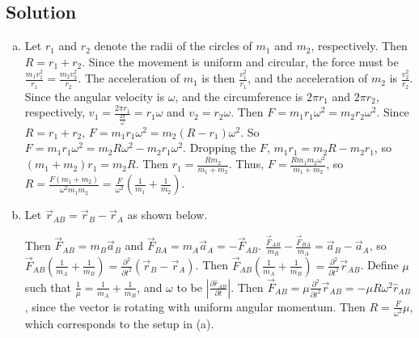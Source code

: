 \documentclass[solutions]{esg8012pset}
\begin{document}
\subsection{Solution}
  \begin{enumerate}[a)]
    \item Let $r_1$ and $r_2$ denote the radii of the circles of $m_1$ and $m_2$, respectively.  Then $R = r_1 + r_2$.  Since the movement is uniform and circular, the force must be $\frac{m_1 v_1^2}{r_1} = \frac{m_2 v_2^2}{r_2}$.  The acceleration of $m_1$ is then $\frac{v_1^2}{r_1}$, and the acceleration of $m_2$ is $\frac{v_2^2}{r_2}$.  Since the angular velocity is $\omega$, and the circumference is $2\pi r_1$ and $2\pi r_2$, respectively, $v_1 = \frac{2\pi r_1}{\frac{2\pi}{\omega}} = r_1 \omega$ and $v_2 = r_2 \omega$.  Then $F = m_1 r_1 \omega^2 =  m_2 r_2 \omega^2$.  Since $R = r_1 + r_2$, $F = m_1 r_1 \omega^2 = m_2 (R - r_1) \omega^2$.  So $F = m_1 r_1 \omega^2 = m_2 R \omega^2 - m_2 r_1 \omega^2$.  Dropping the $F$, $m_1 r_1 = m_2 R - m_2 r_1$, so $(m_1 + m_2)r_1 = m_2 R$.  Then $r_1 = \frac{R m_2}{m_1 + m_2}$.  Thus, $F =  \frac{R m_1 m_2\omega^2}{m_1 + m_2}$, so $R = \frac{F(m_1+m_2)}{\omega^2 m_1 m_2} = \frac{F}{\omega^2}\left(\frac{1}{m_1}+\frac{1}{m_2}\right)$.
    \item Let $\vec r_{AB} = \vec r_B - \vec r_A$ as shown below.
      \begin{center}
      \end{center}
      Then $\vec F_{AB} = m_B \vec a_B$ and $\vec F_{BA} = m_A \vec a_A = -\vec F_{AB}$.  $\frac{\vec F_{AB}}{m_B} - \frac{\vec F_{BA}}{m_A} = \vec a_B - \vec a_A$, so $\vec F_{AB}\left(\frac{1}{m_A} + \frac{1}{m_B}\right) = \frac{\partial^2}{\partial t^2}(\vec r_B - \vec r_A)$.  Then $\vec F_{AB}\left(\frac{1}{m_A} + \frac{1}{m_B}\right) = \frac{\partial^2}{\partial t^2}\vec r_{AB}$.  Define $\mu$ such that $\frac{1}{\mu} = \frac{1}{m_A} + \frac{1}{m_B}$, and $\omega$ to be $\left\vert \frac{\partial \hat r_{AB}}{\partial t}\right\vert$.  Then $\vec F_{AB} = \mu \frac{\partial^2}{\partial t^2}\vec r_{AB} = -\mu R\omega^2\hat r_{AB}$, since the vector is rotating with uniform angular momentum.  Then $R = \frac{F}{\omega^2}\mu$, which corresponds to the setup in (a).
  \end{enumerate}
\end{document}
